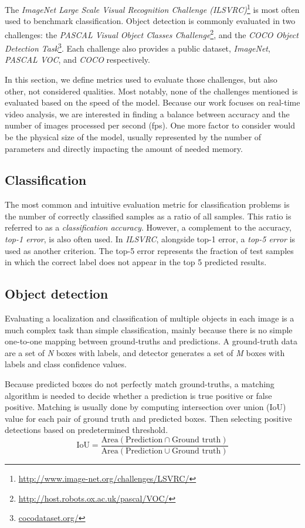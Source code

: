 The \textit{ImageNet Large Scale Visual Recognition Challenge (ILSVRC)}\footnote{\url{http://www.image-net.org/challenges/LSVRC/}} is most often used to benchmark classification. Object detection is commonly evaluated in two challenges: the \textit{PASCAL Visual Object Classes Challenge}\footnote{\url{http://host.robots.ox.ac.uk/pascal/VOC/}}, and the \textit{COCO Object Detection Task}\footnote{\url{cocodataset.org/}}. Each challenge also provides a public dataset, \textit{ImageNet}, \textit{PASCAL VOC}, and \textit{COCO} respectively.

In this section, we define metrics used to evaluate those challenges, but also other, not considered qualities. Most notably, none of the challenges mentioned is evaluated based on the speed of the model. Because our work focuses on real-time video analysis, we are interested in finding a balance between accuracy and the number of images processed per second (fps). One more factor to consider would be the physical size of the model, usually represented by the number of parameters and directly impacting the amount of needed memory.

\subsection*{Classification}
The most common and intuitive evaluation metric for classification problems is the number of correctly classified samples as a ratio of all samples. This ratio is referred to as a \textit{classification accuracy}. However, a complement to the accuracy, \textit{top-1 error}, is also often used. In \textit{ILSVRC},  alongside top-1 error, a \textit{top-5 error} is used as another criterion. The top-5 error represents the fraction of test samples in which the correct label does not appear in the top 5 predicted results.

\subsection*{Object detection}
Evaluating a localization and classification of multiple objects in each image is a much complex task than simple classification, mainly because there is no simple one-to-one mapping between ground-truths and predictions. A ground-truth data are a set of \textit{N} boxes with labels, and detector generates a set of \textit{M} boxes with labels and class confidence values.

Because predicted boxes do not perfectly match ground-truths, a matching algorithm is needed to decide whether a prediction is true positive or false positive. Matching is usually done by computing intersection over union (IoU) value for each pair of ground truth and predicted boxes. Then selecting positive detections based on predetermined threshold.
$$\text{IoU} = \frac{\text{Area}(\text{Prediction} \cap \text{Ground truth})}{\text{Area}(\text{Prediction} \cup \text{Ground truth})}$$

